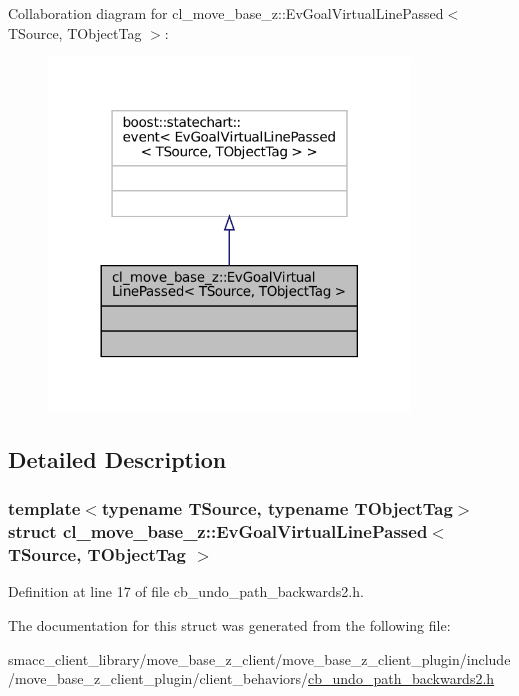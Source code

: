 Collaboration diagram for cl\+\_\+move\+\_\+base\+\_\+z\+:\+:Ev\+Goal\+Virtual\+Line\+Passed$<$ T\+Source, T\+Object\+Tag $>$\+:
\nopagebreak
\begin{figure}[H]
\begin{center}
\leavevmode
\includegraphics[width=272pt]{structcl__move__base__z_1_1EvGoalVirtualLinePassed__coll__graph}
\end{center}
\end{figure}


\subsection{Detailed Description}
\subsubsection*{template$<$typename T\+Source, typename T\+Object\+Tag$>$\newline
struct cl\+\_\+move\+\_\+base\+\_\+z\+::\+Ev\+Goal\+Virtual\+Line\+Passed$<$ T\+Source, T\+Object\+Tag $>$}



Definition at line 17 of file cb\+\_\+undo\+\_\+path\+\_\+backwards2.\+h.



The documentation for this struct was generated from the following file\+:\begin{DoxyCompactItemize}
\item 
smacc\+\_\+client\+\_\+library/move\+\_\+base\+\_\+z\+\_\+client/move\+\_\+base\+\_\+z\+\_\+client\+\_\+plugin/include/move\+\_\+base\+\_\+z\+\_\+client\+\_\+plugin/client\+\_\+behaviors/\hyperlink{cb__undo__path__backwards2_8h}{cb\+\_\+undo\+\_\+path\+\_\+backwards2.\+h}\end{DoxyCompactItemize}
